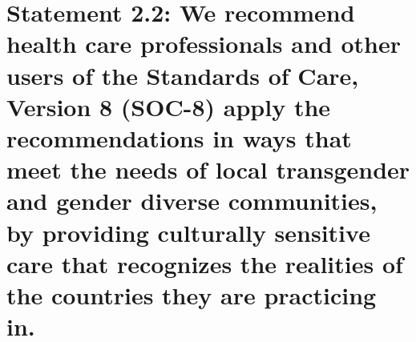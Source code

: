 \documentclass[
]{book}
\begin{document}
\hypertarget{statement-2.2-we-recommend-health-care-professionals-and-other-users-of-the-standards-of-care-version-8-soc-8-apply-the-recommendations-in-ways-that-meet-the-needs-of-local-transgender-and-gender-diverse-communities-by-providing-culturally-sensitive-care-that-recognizes-the-realities-of-the-countries-they-are-practicing-in.}{%
\section*{Statement 2.2: We recommend health care professionals and other users of the Standards of Care, Version 8 (SOC-8) apply the recommendations in ways that meet the needs of local transgender and gender diverse communities, by providing culturally sensitive care that recognizes the realities of the countries they are practicing in.}\label{statement-2.2-we-recommend-health-care-professionals-and-other-users-of-the-standards-of-care-version-8-soc-8-apply-the-recommendations-in-ways-that-meet-the-needs-of-local-transgender-and-gender-diverse-communities-by-providing-culturally-sensitive-care-that-recognizes-the-realities-of-the-countries-they-are-practicing-in.}}
\end{document}
